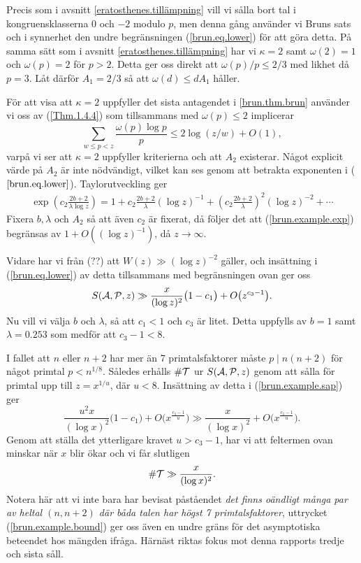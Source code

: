 Precis som i avsnitt \ref{eratosthenes.tillämpning} vill vi sålla bort tal i kongruensklasserna $0$ och $-2$ modulo $p$, 
men denna gång använder vi Bruns sats och i synnerhet den undre begränsningen (\ref{brun.eq.lower}) för att göra detta.
På samma sätt som i avsnitt \ref{eratosthenes.tillämpning} har vi $\kappa=2$ samt $\omega(2)=1$ och $\omega(p)=2$ för $p>2$. Detta ger oss direkt att $\omega(p)/p\leq 2/3$ med likhet då $p=3$. Låt därför $A_1=2/3$ så att $\omega(d)\leq dA_1$ håller.

För att visa att $\kappa=2$ uppfyller det sista antagendet i \ref{brun.thm.brun} använder vi oss av (\ref{Thm.1.4.4}) som tillsammans med $\omega(p)\leq2$ implicerar
\begin{equation*}
    \sum_{w\leq p<z} \frac{\omega(p)\log p}{p} \leq 2\log\left(z/w\right) + O(1),
\end{equation*}
varpå vi ser att $\kappa=2$ uppfyller kriterierna och att $A_2$ existerar.
Något explicit värde på $A_2$ är inte nödvändigt, vilket kan ses genom att betrakta exponenten i ($\ref{brun.eq.lower}$). Taylorutveckling ger
\begin{align}\label{brun.example.exp}
    \exp\left(c_2\frac{2b+2}{\lambda\log z}\right) = 1 + c_2\frac{2b+2}{\lambda}(\log z)^{-1} + \left(c_2\frac{2b+2}{\lambda}\right)^2(\log z)^{-2} + \cdots
\end{align}
Fixera $b,\lambda$ och $A_2$ så att även $c_2$ är fixerat, då följer det att (\ref{brun.example.exp}) begränsas av $1+O((\log z)^{-1})$, då $z\to\infty$.

Vidare har vi från (??) att $W(z) \gg (\log z)^{-2}$ gäller, och insättning i (\ref{brun.eq.lower}) av detta tillsammans med begränsningen ovan ger oss
\begin{equation} \label{brun.example.sap}
    \S{A}{P}{z} \gg \frac{x}{(\log z)^2}\bigl(1 - c_1\bigr) + O\bigl(z^{c_3 - 1}\bigr).
\end{equation}
Nu vill vi välja $b$ och $\lambda$, så att $c_1<1$ och $c_3$ är litet. 
Detta uppfylls av $b=1$ samt $\lambda=0.253$ som medför att $c_3-1<8$.

I fallet att $n$ eller $n+2$ har mer än 7 primtalsfaktorer måste $p\mid n(n+2)$ för något primtal $p < n^{1/8}$.
Således erhålls $\card\mathcal{T}$ ur $\S{A}{P}{z}$ genom att sålla för primtal upp till $z = x^{1/u}$, där $u<8$.
Insättning av detta i (\ref{brun.example.sap}) ger
\begin{equation*}
    \frac{u^2x}{(\log x)^2}\bigl(1 - c_1\bigr) + O\bigl(x^{\frac{c_3 - 1}{u}}\bigr) \gg 
    \frac{x}{(\log x)^2} + O\bigl(x^{\frac{c_3 - 1}{u}}\bigr).
\end{equation*}
Genom att ställa det ytterligare kravet $u>c_3-1$, har vi att feltermen ovan minskar när $x$ blir ökar och vi får slutligen
\begin{equation} \label{brun.example.bound}
    \card\mathcal{T} \gg \frac{x}{(\log x)^2}.
\end{equation}
Notera här att vi inte bara har bevisat påståendet \textit{det finns oändligt många par av heltal $(n,n+2)$ där båda talen har högst 7 primtalsfaktorer},
uttrycket (\ref{brun.example.bound}) ger oss även en undre gräns för det asymptotiska beteendet hos mängden ifråga.
Härnäst riktas fokus mot denna rapports tredje och sista såll.